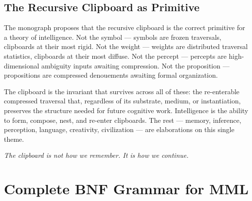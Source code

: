 \documentclass[12pt,oneside]{book}
\theoremstyle{plain}
\theoremstyle{definition}
\theoremstyle{plain}
\begin{document}
\section{The Recursive Clipboard as Primitive}

The monograph proposes that the recursive clipboard is the correct primitive for a theory of intelligence. Not the symbol — symbols are frozen traversals, clipboards at their most rigid. Not the weight — weights are distributed traversal statistics, clipboards at their most diffuse. Not the percept — percepts are high-dimensional ambiguity inputs awaiting compression. Not the proposition — propositions are compressed denouements awaiting formal organization.

The clipboard is the invariant that survives across all of these: the re-enterable compressed traversal that, regardless of its substrate, medium, or instantiation, preserves the structure needed for future cognitive work. Intelligence is the ability to form, compose, nest, and re-enter clipboards. The rest — memory, inference, perception, language, creativity, civilization — are elaborations on this single theme.

\vspace{1em}
\noindent\textit{The clipboard is not how we remember. It is how we continue.}


\appendix

\chapter{Complete BNF Grammar for MML}
\label{app:mml_grammar}
\end{document}
